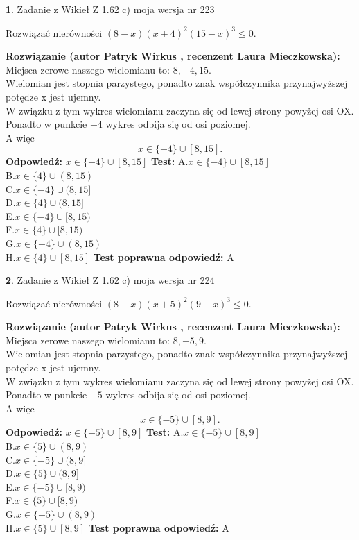 \documentclass[12pt, a4paper]{article}
\theoremstyle{definition} %
\newtheorem{zad}{}
\newcommand{\zadStart}[1]{\begin{zad}#1\newline}
\newcommand{\zadStop}{\end{zad}}
\newcommand{\rozwStart}[2]{\noindent \textbf{Rozwiązanie (autor #1 , recenzent #2): }\newline}
\newcommand{\rozwStop}{\newline}
\newcommand{\odpStart}{\noindent \textbf{Odpowiedź:}\newline}
\newcommand{\odpStop}{\newline}
\newcommand{\testStart}{\noindent \textbf{Test:}\newline}
\newcommand{\testStop}{\newline}
\newcommand{\kluczStart}{\noindent \textbf{Test poprawna odpowiedź:}\newline}
\newcommand{\kluczStop}{\newline}
\begin{document}
\zadStart{Zadanie z Wikieł Z 1.62 c) moja wersja nr 223}

Rozwiązać nierówności $(8-x)(x+4)^{2}(15-x)^{3}\le0$.
\zadStop
\rozwStart{Patryk Wirkus}{Laura Mieczkowska}
Miejsca zerowe naszego wielomianu to: $8, -4, 15$.\\
Wielomian jest stopnia parzystego, ponadto znak współczynnika przy\linebreak najwyższej potędze x jest ujemny.\\ W związku z tym wykres wielomianu zaczyna się od lewej strony powyżej osi OX.\\
Ponadto w punkcie $-4$ wykres odbija się od osi poziomej.\\
A więc $$x \in \{-4\} \cup [8,15].$$
\rozwStop
\odpStart
$x \in \{-4\} \cup [8,15]$
\odpStop
\testStart
A.$x \in \{-4\} \cup [8,15]$\\
B.$x \in \{4\} \cup (8,15)$\\
C.$x \in \{-4\} \cup (8,15]$\\
D.$x \in \{4\} \cup (8,15]$\\
E.$x \in \{-4\} \cup [8,15)$\\
F.$x \in \{4\} \cup [8,15)$\\
G.$x \in \{-4\} \cup (8,15)$\\
H.$x \in \{4\} \cup [8,15]$
\testStop
\kluczStart
A
\kluczStop



\zadStart{Zadanie z Wikieł Z 1.62 c) moja wersja nr 224}

Rozwiązać nierówności $(8-x)(x+5)^{2}(9-x)^{3}\le0$.
\zadStop
\rozwStart{Patryk Wirkus}{Laura Mieczkowska}
Miejsca zerowe naszego wielomianu to: $8, -5, 9$.\\
Wielomian jest stopnia parzystego, ponadto znak współczynnika przy\linebreak najwyższej potędze x jest ujemny.\\ W związku z tym wykres wielomianu zaczyna się od lewej strony powyżej osi OX.\\
Ponadto w punkcie $-5$ wykres odbija się od osi poziomej.\\
A więc $$x \in \{-5\} \cup [8,9].$$
\rozwStop
\odpStart
$x \in \{-5\} \cup [8,9]$
\odpStop
\testStart
A.$x \in \{-5\} \cup [8,9]$\\
B.$x \in \{5\} \cup (8,9)$\\
C.$x \in \{-5\} \cup (8,9]$\\
D.$x \in \{5\} \cup (8,9]$\\
E.$x \in \{-5\} \cup [8,9)$\\
F.$x \in \{5\} \cup [8,9)$\\
G.$x \in \{-5\} \cup (8,9)$\\
H.$x \in \{5\} \cup [8,9]$
\testStop
\kluczStart
A
\kluczStop
\end{document}
